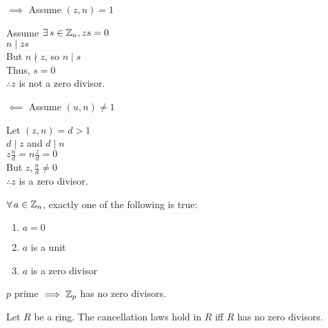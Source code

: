 \documentclass[letterpaper,12pt,fleqn]{article}
\begin{document}
\begin{theproof}
  \listbreak
  \begin{description}
    \begin{minipage}[t]{3in}
    \item $\implies$ Assume $(z,n)=1$

      Assume $\exists\,s\in\mathbb{Z}_n,zs=0$ \\
      $n\mid zs$ \\
      But $n\nmid z$, so $n\mid s$ \\
      Thus, $s=0$ \\
      $\therefore z$ is not a zero divisor.
    \end{minipage}
    \begin{minipage}[t]{3in}
    \item $\impliedby$ Assume $(u,n)\ne1$

      Let $(z,n)=d>1$ \\
      $d\mid z$ and $d\mid n$ \\
      $z\frac{n}{d}=n\frac{z}{d}=0$ \\
      But $z,\frac{n}{d}\ne0$ \\
      $\therefore z$ is a zero divisor.
    \end{minipage}
  \end{description}
\end{theproof}
\newpage
\begin{corollary}
  $\forall\,a\in\mathbb{Z}_n$, exactly one of the following is true:
  \begin{enumerate}
  \item $a=0$
  \item $a$ is a unit
  \item $a$ is a zero divisor
  \end{enumerate}
\end{corollary}

\begin{corollary}
  $p$ prime $\implies \mathbb{Z}_p$ has no zero divisors.
\end{corollary}

\begin{theorem}
  Let $R$ be a ring. The cancellation laws hold in $R$ iff $R$ has no zero
  divisors.
\end{theorem}
\end{document}
